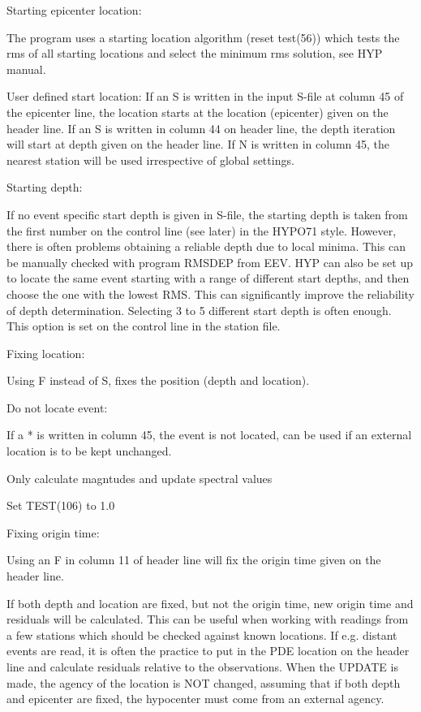 Starting epicenter location: 

The program uses a starting location algorithm (reset test(56)) which tests the rms of all starting locations and select the minimum rms solution, see HYP manual. 

User defined start location: If an S is written in the input S-file at column 45 of the epicenter line, the location starts at the location (epicenter) given on the header line. If an S is written in column 44 on header line, the depth iteration will start at depth given on the header line. If N is written in column 45, the nearest station will be used irrespective of global settings.  

Starting depth: 

If no event specific start depth is given in S-file, the starting depth is taken from the first number on the control line (see later) in the HYPO71 style. However, there is often problems obtaining a reliable depth due to local minima. This can be manually checked with program RMSDEP from EEV. HYP can also be set up to locate the same event starting with a range of different start depths, and then choose the one with the lowest RMS. This can significantly improve the reliability of depth determination. Selecting 3 to 5 different start depth is often enough. This option is set on the control line in the station file. 

Fixing location: 

Using F instead of S, fixes the position (depth and location).  

Do not locate event:  

If a * is written in column 45, the event is not located, can be 
used if an external location is to be kept unchanged. 

Only calculate magntudes and update spectral values 

Set TEST(106) to 1.0 

Fixing origin time: 

Using an F in column 11 of header line will fix the origin time given on the header line. 

If both depth and location are fixed, but not the origin time, new origin time and residuals will be calculated. This can be useful when working with readings from a few stations which should be checked against known locations. If e.g. distant events are read, it is often the practice to put in the PDE location on the header line and calculate residuals relative to the observations. When the UPDATE is made, the agency of the location is NOT changed, assuming that if both depth and epicenter are fixed, the hypocenter must come from an external agency. 

